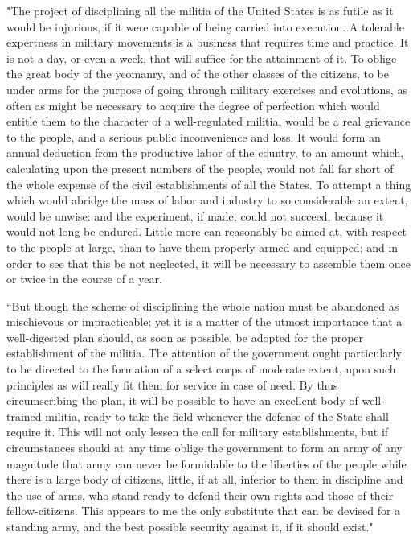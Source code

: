 "The project of disciplining all the militia of the United States is as futile as it would be injurious, if it were capable of being carried into execution. A tolerable expertness in military movements is a business that requires time and practice. It is not a day, or even a week, that will suffice for the attainment of it. To oblige the great body of the yeomanry, and of the other classes of the citizens, to be under arms for the purpose of going through military exercises and evolutions, as often as might be necessary to acquire the degree of perfection which would entitle them to the character of a well-regulated militia, would be a real grievance to the people, and a serious public inconvenience and loss. It would form an annual deduction from the productive labor of the country, to an amount which, calculating upon the present numbers of the people, would not fall far short of the whole expense of the civil establishments of all the States. To attempt a thing which would abridge the mass of labor and industry to so considerable an extent, would be unwise: and the experiment, if made, could not succeed, because it would not long be endured. Little more can reasonably be aimed at, with respect to the people at large, than to have them properly armed and equipped; and in order to see that this be not neglected, it will be necessary to assemble them once or twice in the course of a year.

``But though the scheme of disciplining the whole nation must be abandoned as mischievous or impracticable; yet it is a matter of the utmost importance that a well-digested plan should, as soon as possible, be adopted for the proper establishment of the militia. The attention of the government ought particularly to be directed to the formation of a select corps of moderate extent, upon such principles as will really fit them for service in case of need. By thus circumscribing the plan, it will be possible to have an excellent body of well-trained militia, ready to take the field whenever the defense of the State shall require it. This will not only lessen the call for military establishments, but if circumstances should at any time oblige the government to form an army of any magnitude that army can never be formidable to the liberties of the people while there is a large body of citizens, little, if at all, inferior to them in discipline and the use of arms, who stand ready to defend their own rights and those of their fellow-citizens. This appears to me the only substitute that can be devised for a standing army, and the best possible security against it, if it should exist."

